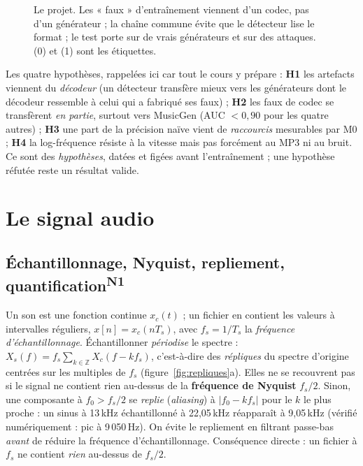\documentclass[10pt,a4paper]{article}
\newcommand{\nref}[1]{\textsuperscript{\scriptsize\textcolor{black!55}{#1}}}
\begin{document}
\begin{figure}[ht]
\caption{Le projet. Les « faux » d'entraînement viennent d'un codec, pas d'un générateur ; la chaîne commune évite que le détecteur lise le format ; le test porte sur de vrais générateurs et sur des attaques. (0) et (1) sont les étiquettes.}\label{fig:projet}
\end{figure}

Les quatre hypothèses, rappelées ici car tout le cours y prépare : \textbf{H1} les artefacts viennent du \emph{décodeur} (un détecteur transfère mieux vers les générateurs dont le décodeur ressemble à celui qui a fabriqué ses faux) ; \textbf{H2} les faux de codec se transfèrent \emph{en partie}, surtout vers MusicGen (AUC $<0{,}90$ pour les quatre autres) ; \textbf{H3} une part de la précision naïve vient de \emph{raccourcis} mesurables par M0 ; \textbf{H4} la log-fréquence résiste à la vitesse mais pas forcément au MP3 ni au bruit. Ce sont des \emph{hypothèses}, datées et figées avant l'entraînement ; une hypothèse réfutée reste un résultat valide.

\section{Le signal audio}\label{sec:signal}

\subsection{Échantillonnage, Nyquist, repliement, quantification\nref{N1}}
Un son est une fonction continue $x_c(t)$ ; un fichier en contient les valeurs à intervalles réguliers, $x[n]=x_c(nT_s)$, avec $f_s=1/T_s$ la \emph{fréquence d'échantillonnage}. Échantillonner \emph{périodise} le spectre : $X_s(f)=f_s\sum_{k\in\mathbb Z}X_c(f-kf_s)$, c'est-à-dire des \emph{répliques} du spectre d'origine centrées sur les multiples de $f_s$ (figure~\ref{fig:repliques}a). Elles ne se recouvrent pas si le signal ne contient rien au-dessus de la \textbf{fréquence de Nyquist} $f_s/2$. Sinon, une composante à $f_0>f_s/2$ se \emph{replie} (\emph{aliasing}) à $|f_0-kf_s|$ pour le $k$ le plus proche : un sinus à 13\,kHz échantillonné à 22,05\,kHz réapparaît à 9,05\,kHz (vérifié numériquement : pic à 9\,050\,Hz). On évite le repliement en filtrant passe-bas \emph{avant} de réduire la fréquence d'échantillonnage. Conséquence directe : un fichier à $f_s$ ne contient \emph{rien} au-dessus de $f_s/2$.
\end{document}
